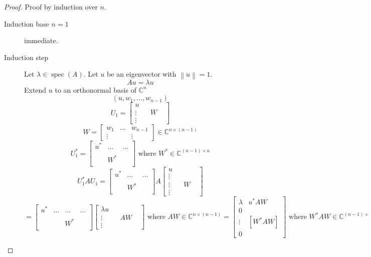 \documentclass{article}
\newcommand{\norm}[1]{\left\|#1\right\|}
\begin{document}
\begin{proof}
  Proof by induction over $n$.
  \begin{description}
    \item[Induction base $n=1$] immediate.
    \item[Induction step]
      Let $\lambda \in \operatorname{spec}(A)$. Let $u$ be an eigenvector with $\norm{u} = 1$.
      \[ Au = \lambda u \]
      Extend $u$ to an orthonormal basis of $\mathbb C^n$
      \[ (u, w_1, \dots, w_{n-1}) \]
      \[ U_1 = \begin{bmatrix} u & & & \\ \vdots & & W & \\ \vdots & & & \end{bmatrix} \]
      \[ W = \begin{bmatrix} w_1 & \dots & w_{n-1} \\ \vdots &  & \vdots \end{bmatrix} \in \mathbb C^{n \times (n-1)} \]
      \[ U_1^* = \begin{bmatrix} u^* & \dots & \dots \\ & & \\ & W^* & \\ & & \end{bmatrix} \text{ where } W^* \in \mathbb C^{(n-1) \times n} \]
      \[ U_1^* AU_1 = \begin{bmatrix} u^* & \dots & \dots \\ & & \\ & W^* & \\ & & \end{bmatrix} A \begin{bmatrix} u & & & \\ \vdots & & & \\ \vdots & & W & \\ \vdots & & & \end{bmatrix} \]
      \[ = \begin{bmatrix} u^* & \dots & \dots & \dots \\ & & & \\ & & W^* & \\ & & & \end{bmatrix} \begin{bmatrix} \lambda u & & & \\ \vdots & & AW & \\ \vdots & & & \end{bmatrix} \text{ where } AW \in \mathbb C^{n \times (n-1)} = \begin{bmatrix} \lambda & u^* AW \\ 0 & \\ \vdots & [W^* AW] \\ 0 & \end{bmatrix} \text{ where } W^* AW \in \mathbb C^{(n - 1) \times (n-1)} \]

\end{description}
\end{proof}
\end{document}
